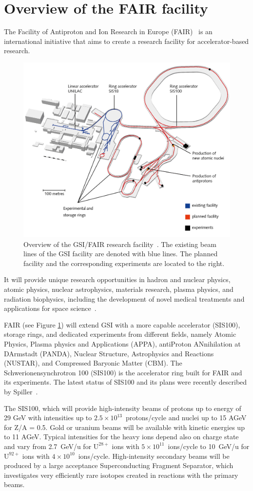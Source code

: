 \section{Overview of the FAIR facility}
The Facility of Antiproton and Ion Research in Europe (\gls{FAIR})~\cite{fair} is an international initiative that aims to create a research facility for accelerator-based research. 

\begin{figure}[!h]
    \centering
    \includegraphics[width=0.75\columnwidth]{Chapter2/images/fair.jpg}
    \caption{Overview of the GSI/FAIR research facility~\cite{fair}. The existing beam lines of the \gls{GSI} facility are denoted with blue lines. The planned facility and the corresponding experiments are located to the right.}
    \label{fig:fair}
\end{figure}

It will provide unique research opportunities in hadron and nuclear physics, atomic physics, nuclear astrophysics, materials research, plasma physics, and radiation biophysics, including the development of novel medical treatments and applications for space science~\cite{fair1}. 
 
FAIR (see Figure \ref{fig:fair}) will extend GSI with a more capable accelerator (SIS100), storage rings, and dedicated experiments from different fields, namely Atomic Physics, Plasma physics and Applications (APPA), antiProton ANnihilation at DArmstadt (PANDA), Nuclear Structure, Astrophysics and Reactions (NUSTAR), and Compressed Baryonic Matter (\gls{CBM}). The Schwerionensynchrotron 100 (SIS100) is
the accelerator ring built for FAIR and its experiments. The latest status of SIS100 and its plans were recently described by Spiller~\cite{Spiller_2020}.

The SIS100, which will provide high-intensity beams of protons up
to energy of 29 GeV  with intensities up to $2.5\times 10^{13}$~protons/cycle and nuclei up to 15 AGeV for Z/A = 0.5. Gold or uranium beams will be available with kinetic energies up to 11 AGeV. Typical intensities for the heavy ions depend also on charge state and vary from 2.7~GeV/u for $\mathrm{U^{28+}}$ ions with $5\times 10^{11}$~ions/cycle to 10~GeV/u for $\mathrm{U^{92+}}$ ions with $4\times 10^{10}$~ions/cycle. High-intensity secondary beams will be produced by a large acceptance Superconducting Fragment Separator, which investigates very efficiently rare isotopes created in reactions with the primary beams. 